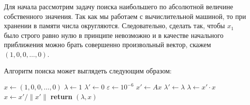 \documentclass[a4paper,12pt]{article}
\begin{document}
	Для начала рассмотрим задачу поиска наибольшего по абсолютной величине собственного значения. Так как мы работаем с вычислительной машиной, то при хранении в памяти числа округляются. Следовательно, сделать так, чтобы \( x_1 \) было строго равно нулю в принципе невозможно и в качестве начального приближения можно брать совершенно произвольный вектор, скажем \( (1, 0, 0, \ldots, 0) \).

	Алгоритм поиска может выглядеть следующим образом:
	\begin{algorithm}[h]
	  \begin{algorithmic}
	    \State $x \gets (1, 0, 0, \ldots, 0)$ 
	    \State $ \lambda \gets 1 $ 
	    \State $ \lambda' \gets 0 $ 
	    \State $ \varepsilon \gets 10^{-6} $ 
	      \State $x' \gets Ax$
	      \State $\lambda' \gets \lambda$
	      \State $\lambda  \gets x' \cdot x $
	      \State $x \gets x' / \| x' \|  $ 
	    \EndWhile
	    \State \textbf{return} $(\lambda, x)$
	    \EndFunction
	  \end{algorithmic}
	\end{algorithm}
\end{document}
